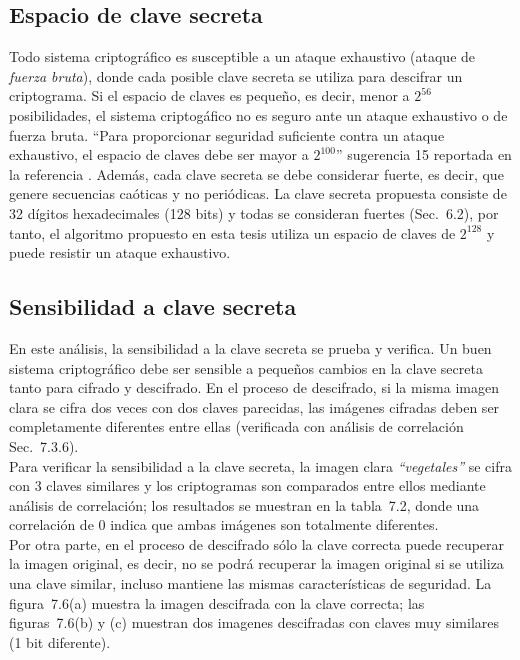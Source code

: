 \subsection{Espacio de clave secreta}
Todo sistema criptográfico es susceptible a un ataque exhaustivo (ataque de \textit{fuerza bruta}), donde cada posible clave secreta se utiliza para descifrar un criptograma. Si el espacio de claves es pequeño, es decir, menor a $2^{56}$ posibilidades, el sistema criptogáfico no es seguro ante un ataque exhaustivo o de fuerza bruta. ``Para proporcionar seguridad suficiente contra un ataque exhaustivo, el espacio de claves debe ser mayor a $2^{100}$'' sugerencia 15 reportada en la referencia \cite{AyL_2006}. Además, cada clave secreta se debe considerar fuerte, es decir, que genere secuencias caóticas y no periódicas. La clave secreta propuesta consiste de 32 dígitos hexadecimales (128 bits) y todas se consideran fuertes (Sec.~6.2), por tanto, el algoritmo propuesto en esta tesis utiliza un espacio de claves de $2^{128}$ y puede resistir un ataque exhaustivo.

\subsection{Sensibilidad a clave secreta}
En este análisis, la sensibilidad a la clave secreta se prueba y verifica. Un buen sistema criptográfico debe ser sensible a pequeños cambios en la clave secreta tanto para cifrado y descifrado. En el proceso de descifrado, si la misma imagen clara se cifra dos veces con dos claves parecidas, las imágenes cifradas deben ser completamente diferentes entre ellas (verificada con análisis de correlación Sec.~7.3.6). \\

Para verificar la sensibilidad a la clave secreta, la imagen clara \textit{``vegetales''} se cifra con 3 claves similares y los criptogramas son comparados entre ellos mediante análisis de correlación; los resultados se muestran en la tabla~7.2, donde una correlación de 0 indica que ambas imágenes son totalmente diferentes. \\

Por otra parte, en el proceso de descifrado sólo la clave correcta puede recuperar la imagen original, es decir, no se podrá recuperar la imagen original si se utiliza una clave similar, incluso mantiene las mismas características de seguridad. La figura~7.6(a) muestra la imagen descifrada con la clave correcta; las figuras~7.6(b) y (c) muestran dos imagenes descifradas con claves muy similares (1 bit diferente). \\

